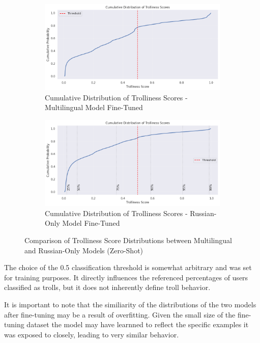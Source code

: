 \documentclass[twoside]{ctuthesis}
\theoremstyle{plain}
\theoremstyle{definition}
\theoremstyle{note}
\begin{document}
\begin{figure}[h]
    \centering
    \begin{subfigure}{0.49\textwidth}
        \includegraphics[width=\linewidth]{figures/cumulative_mult.png}
        \caption{Cumulative Distribution of Trolliness Scores - Multilingual Model Fine-Tuned}
        \label{fig:cumulative_mult}
    \end{subfigure}
    \hfill
    \begin{subfigure}{0.49\textwidth}
        \includegraphics[width=\linewidth]{figures/cumulative_ru.png}
        \caption{Cumulative Distribution of Trolliness Scores - Russian-Only Model Fine-Tuned}
        \label{fig:cumulative_ru}
    \end{subfigure}
    \caption{Comparison of Trolliness Score Distributions between Multilingual and Russian-Only Models (Zero-Shot)}
    \label{fig:cumulative_comparison_finetuned}
\end{figure}

The choice of the 0.5 classification threshold is somewhat arbitrary and was set for training purposes. It directly influences the referenced percentages of users classified as trolls, but it does not inherently define troll behavior.\par
It is important to note that the similiarity of the distributions of the two models after fine-tuning may be a result of overfitting. Given the small size of the fine-tuning dataset the model may have learnned to reflect the specific examples it was exposed to closely, leading to very similar behavior.\par
\end{document}
